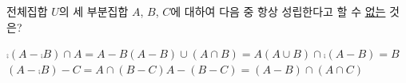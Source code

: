 전체집합 $U$의 세 부분집합 $A$, $B$, $C$에 대하여 다음 중 항상 성립한다고 할 수 \underline{없는} 것은?
\begin{choicesv}{$\comp{(A-\comp{B})}\cap A=A-B$}{$(A-B)\cup(A\cap B)=A$}{$(A\cup B)\cap\comp{(A-B)}=B$}{$(A-\comp{B})-C=A\cap(B-C)$}{$A-(B-C)=(A-B)\cap(A\cap C)$}\end{choicesv}
